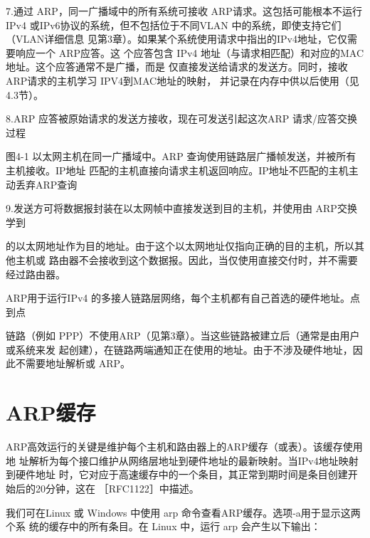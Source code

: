 7.通过 ARP，同一广播域中的所有系统可接收 ARP请求。这包括可能根本不运行IPv4
或IPv6协议的系统，但不包括位于不同VLAN 中的系统，即使支持它们（VLAN详细信息
见第3章）。如果某个系统使用请求中指出的IPv4地址，它仅需要响应一个 ARP应答。这
个应答包含 IPv4 地址（与请求相匹配）和对应的MAC地址。这个应答通常不是广播，而是
仅直接发送给请求的发送方。同时，接收ARP请求的主机学习 IPV4到MAC地址的映射，
并记录在内存中供以后使用（见4.3节）。

8.ARP 应答被原始请求的发送方接收，现在可发送引起这次ARP 请求/应答交换过程

图4-1 以太网主机在同一广播域中。ARP 查询使用链路层广播帧发送，并被所有主机接收。IP地址
匹配的主机直接向请求主机返回响应。IP地址不匹配的主机主动丢弃ARP查询

9.发送方可将数据报封装在以太网帧中直接发送到目的主机，并使用由 ARP交换学到

的以太网地址作为目的地址。由于这个以太网地址仅指向正确的目的主机，所以其他主机或
路由器不会接收到这个数据报。因此，当仅使用直接交付时，并不需要经过路由器。

ARP用于运行IPv4 的多接人链路层网络，每个主机都有自己首选的硬件地址。点到点

链路（例如 PPP）不使用ARP（见第3章）。当这些链路被建立后（通常是由用户或系统来发
起创建），在链路两端通知正在使用的地址。由于不涉及硬件地址，因此不需要地址解析或
ARP。

\section{ARP缓存}

ARP高效运行的关键是维护每个主机和路由器上的ARP缓存（或表）。该缓存使用地
址解析为每个接口维护从网络层地址到硬件地址的最新映射。当IPv4地址映射到硬件地址
时，它对应于高速缓存中的一个条目，其正常到期时间是条目创建开始后的20分钟，这在
［RFC1122］中描述。

我们可在Linux 或 Windows 中使用 arp 命令查看ARP缓存。选项-a用于显示这两个系
统的缓存中的所有条目。在 Linux 中，运行 arp 会产生以下输出：

